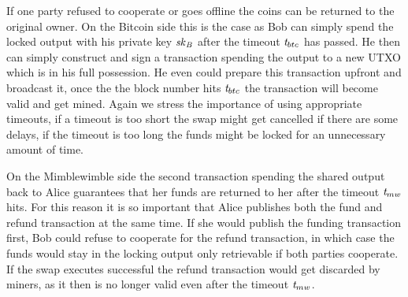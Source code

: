 If one party refused to cooperate or goes offline the coins can be returned to the original owner.
On the Bitcoin side this is the case as Bob can simply spend the locked output with his private key $\mathit{sk}_{\mathit{B}}$ after the timeout $\mathit{t}_{btc}$ has passed.
He then can simply construct and sign a transaction spending the output to a new UTXO which is in his full possession.
He even could prepare this transaction upfront and broadcast it, once the the block number hits $\mathit{t}_{btc}$ the transaction will become valid and get mined.
Again we stress the importance of using appropriate timeouts, if a timeout is too short the swap might get cancelled if there are some delays, if the timeout is too long the funds might be locked for an unnecessary amount of time.

On the Mimblewimble side the second transaction spending the shared output back to Alice guarantees that her funds are returned to her after the timeout $\mathit{t}_{mw}$ hits.
For this reason it is so important that Alice publishes both the fund and refund transaction at the same time.
If she would publish the funding transaction first, Bob could refuse to cooperate for the refund transaction, in which case the funds would stay in the locking output only retrievable if both parties cooperate.
If the swap executes successful the refund transaction would get discarded by miners, as it then is no longer valid even after the timeout $\mathit{t}_{mw}$.